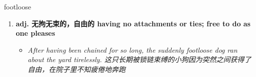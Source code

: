 
\begin{frame}
{\huge footloose}
\begin{center}
\begin{enumerate}\Large
  \item \textbf{adj. 无拘无束的，自由的 having no attachments or ties; free to do as one pleases}
  \begin{itemize}
    \item \em{\Large{After having been chained for so long, the suddenly footloose dog ran about the yard tirelessly. 这只长期被锁链束缚的小狗因为突然之间获得了自由，在院子里不知疲倦地奔跑}}
  \end{itemize}
\end{enumerate}
\end{center}
\end{frame}
